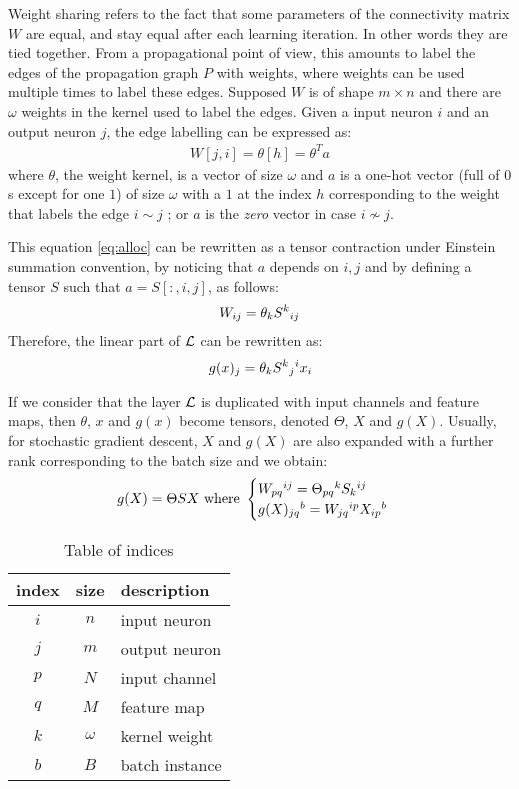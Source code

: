 Weight sharing refers to the fact that some parameters of the connectivity matrix $W$ are equal, and stay equal after each learning iteration. In other words they are tied together. From a propagational point of view, this amounts to label the edges of the propagation graph $P$ with weights, where weights can be used multiple times to label these edges. Supposed $W$ is of shape $m \times n$ and there are $\omega$ weights in the kernel used to label the edges. Given a input neuron $i$ and an output neuron $j$, the edge labelling can be expressed as:
\begin{gather}
W[j,i] = \theta[h] = \theta^T a \label{eq:alloc}
\end{gather}
where $\theta$, the weight kernel, is a vector of size $\omega$ and $a$ is a one-hot vector (full of $0$s except for one $1$) of size $\omega$ with a $1$ at the index $h$ corresponding to the weight that labels the edge $i \sim j$ ; or $a$ is the \emph{zero} vector in case $i \nsim j$.

This equation \eqref{eq:alloc} can be rewritten as a tensor contraction under Einstein summation convention, by noticing that $a$ depends on $i,j$ and by defining a tensor $S$ such that $a = S[:,i,j]$, as follows:
\begin{gather}
W_{ij} = \theta_k S^k \h{0}_{ij}
\end{gather}
Therefore, the linear part of $\cl$ can be rewritten as:
\begin{gather}
g(x)_j = \theta_k S^k \h{0}_j \h{0}^i x_i
\end{gather}

If we consider that the layer $\cl$ is duplicated with input channels and feature maps, then $\theta$, $x$ and $g(x)$ become tensors, denoted $\Theta$, $X$ and $g(X)$. Usually, for stochastic gradient descent, $X$ and $g(X)$ are also expanded with a further rank corresponding to the batch size and we obtain:
\begin{gather}
g(X) = \Theta S X
\text{ where } \begin{cases} W_{pq}\h{0}^{ij} = \Theta_{pq}\h{0}^k S_k\h{0}^{ij} \\ g(X)_{jq}\h{0}^b = W_{jq}\h{0}^{ip} X_{ip}\h{0}^{b} \end{cases} \label{eq:ternary}
\end{gather}

\begin{table}[H]
  \centering
\begin{tabular}{ccl}
  index & size & description\\
  \hline
  $i$ & $n$ & input neuron\\
  $j$ & $m$ & output neuron\\
  $p$ & $N$ & input channel\\
  $q$ & $M$ & feature map\\
  $k$ & $\omega$ & kernel weight\\
  $b$ & $B$ & batch instance
\end{tabular}
\caption{Table of indices}
\label{tab:ind}
\end{table}

